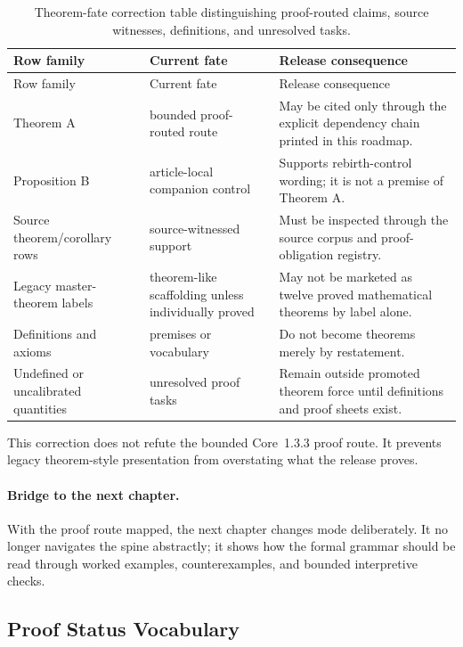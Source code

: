 \begin{octablescope}
\begin{longtable}{@{}L{0.22\textwidth}L{0.24\textwidth}L{0.44\textwidth}@{}}
\caption{Theorem-fate correction table distinguishing proof-routed claims, source witnesses, definitions, and unresolved tasks.}\label{tab:r013-theorem-fate-correction}\\
\toprule
Row family & Current fate & Release consequence \\
\midrule
\endfirsthead
\toprule
Row family & Current fate & Release consequence \\
\midrule
\endhead
Theorem A & bounded proof-routed route & May be cited only through the explicit dependency chain printed in this roadmap. \\
Proposition B & article-local companion control & Supports rebirth-control wording; it is not a premise of Theorem A. \\
Source theorem/corollary rows & source-witnessed support & Must be inspected through the source corpus and proof-obligation registry. \\
Legacy master-theorem labels & theorem-like scaffolding unless individually proved & May not be marketed as twelve proved mathematical theorems by label alone. \\
Definitions and axioms & premises or vocabulary & Do not become theorems merely by restatement. \\
Undefined or uncalibrated quantities & unresolved proof tasks & Remain outside promoted theorem force until definitions and proof sheets exist. \\
\bottomrule
\end{longtable}
\end{octablescope}

This correction does not refute the bounded Core~1.3.3 proof route. It prevents
legacy theorem-style presentation from overstating what the release proves.

\paragraph{Bridge to the next chapter.}
With the proof route mapped, the next chapter changes mode deliberately. It no
longer navigates the spine abstractly; it shows how the formal grammar should
be read through worked examples, counterexamples, and bounded interpretive
checks.

\clearpage


\subsection{Proof Status Vocabulary}

